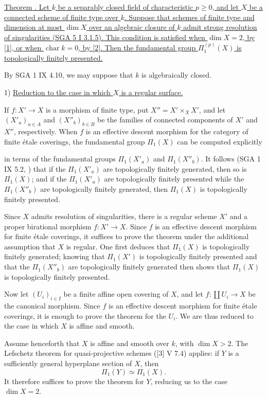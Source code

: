 \underline{Theorem . Let $k$ be a separably closed field of
characteristic $p\geq 0$, and let $X$ be a connected scheme of finite
type over $k$. Suppose that schemes of finite type and dimension at most
$\dim X$ over an algebraic closure of $k$ admit strong resolution of
singularities (SGA 5 I 3.1.5). This condition is satisfied when
$\dim X=2$, by [1], or when $\operatorname{char}k=0$, by [2]. Then the
fundamental group $\Pi_1^{(p)}(X)$ is topologically finitely presented.}

By SGA 1 IX 4.10, we may suppose that $k$ is algebraically closed.

1) \underline{Reduction to the case in which $X$ is a regular surface.}

If $f:X'\longrightarrow X$ is a morphism of finite type, put
$X''=X'\times_X X'$, and let $(X'_a)_{a\in A}$ and
$(X''_b)_{b\in B}$ be the families of connected components of $X'$ and
$X''$, respectively. When $f$ is an effective descent morphism for the
category of finite \'etale coverings, the fundamental group $\Pi_1(X)$
can be computed explicitly


in terms of the fundamental groups $\Pi_1(X'_a)$ and $\Pi_1(X''_b)$.
It follows (SGA 1 IX 5.2, ) that if the $\Pi_1(X'_a)$ are
topologically finitely generated, then so is $\Pi_1(X)$; and if the
$\Pi_1(X'_a)$ are topologically finitely presented while the
$\Pi_1(X''_b)$ are topologically finitely generated, then $\Pi_1(X)$ is
topologically finitely presented.

Since $X$ admits resolution of singularities, there is a regular scheme
$X'$ and a proper birational morphism $f:X'\longrightarrow X$. Since
$f$ is an effective descent morphism for finite \'etale coverings, it
suffices to prove the theorem under the additional assumption that $X$
is regular. One first deduces that $\Pi_1(X)$ is topologically finitely
generated; knowing that $\Pi_1(X')$ is topologically finitely presented
and that the $\Pi_1(X''_b)$ are topologically finitely generated then
shows that $\Pi_1(X)$ is topologically finitely presented.

Now let $(U_i)_{i\in I}$ be a finite affine open covering of $X$, and
let $f:\coprod U_i\longrightarrow X$ be the canonical morphism. Since
$f$ is an effective descent morphism for finite \'etale coverings, it is
enough to prove the theorem for the $U_i$. We are thus reduced to the
case in which $X$ is affine and smooth.

Assume henceforth that $X$ is affine and smooth over $k$, with
$\dim X>2$. The Lefschetz theorem for quasi-projective schemes
([3] V 7.4) applies: if $Y$ is a sufficiently general hyperplane section
of $X$, then
\[
 \Pi_1(Y)\simeq\Pi_1(X).
\]
It therefore suffices to prove the theorem for $Y$, reducing us to the
case $\dim X=2$.


